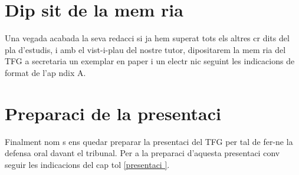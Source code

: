 \section{Dip sit de la mem ria}

Una vegada acabada la seva redacci  si ja hem superat tots els altres cr dits del pla d'estudis, i amb el vist-i-plau del nostre tutor, dipositarem la mem ria del TFG a secretaria un exemplar en paper i un electr nic seguint les indicacions de format de l'ap ndix A.

\section{Preparaci  de la presentaci }

Finalment nom s ens quedar  preparar la presentaci  del TFG per tal de fer-ne la defensa oral davant el tribunal. Per a la preparaci  d'aquesta presentaci  conv  seguir les indicacions del cap tol \ref{presentaci }.
